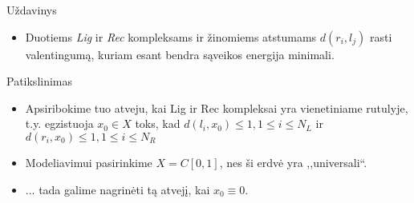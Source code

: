 \documentclass[11pt]{beamer}
\begin{document}

\begin{frame}{Uždavinys}
\begin{itemize}
\item Duotiems \textit{Lig} ir \textit{Rec} kompleksams ir žinomiems atstumams $d(r_i, l_j)$ rasti valentingumą, kuriam esant bendra sąveikos energija minimali.

\end{itemize}
\end{frame}



\begin{frame}{Patikslinimas}
\begin{itemize}
\item Apsiribokime tuo atveju, kai Lig ir Rec kompleksai yra vienetiniame rutulyje, t.y. 
egzistuoja $x_0 \in X$ toks, kad $d(l_i, x_0) \leqslant 1, 1 \leqslant i \leqslant N_L $  ir 
$d(r_i, x_0) \leqslant 1, 1 \leqslant i \leqslant N_R$
\item Modeliavimui pasirinkime $X = C[0,1]$, nes ši erdvė yra ,,universali``.
\item ... tada  galime nagrinėti tą atvejį, kai $x_0 \equiv 0$. 


\end{itemize}
\end{frame}
\end{document}
